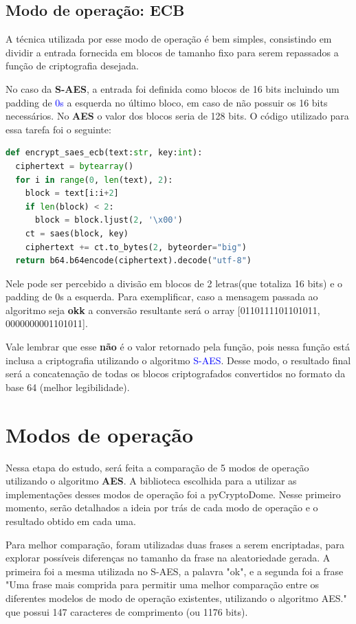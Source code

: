 \documentclass[12pt]{article}
\newcommand{\blue}[1]{\textcolor{blue}{#1}}
\begin{document}
\subsection{Modo de operação: ECB}
A técnica utilizada por esse modo de operação é bem simples, consistindo em dividir a entrada fornecida em blocos de tamanho fixo para serem repassados a função de criptografia desejada.

No caso da \textbf{S-AES}, a entrada foi definida como blocos de 16 bits incluindo um padding de \blue{0s} a esquerda no último bloco, em caso de não possuir os 16 bits necessários. No \textbf{AES} o valor dos blocos seria de 128 bits. O código utilizado para essa tarefa foi o seguinte:

\begin{lstlisting}[language=Python]
def encrypt_saes_ecb(text:str, key:int):
  ciphertext = bytearray()
  for i in range(0, len(text), 2):
    block = text[i:i+2]
    if len(block) < 2:
      block = block.ljust(2, '\x00')
    ct = saes(block, key)
    ciphertext += ct.to_bytes(2, byteorder="big")
  return b64.b64encode(ciphertext).decode("utf-8")
\end{lstlisting}

Nele pode ser percebido a divisão em blocos de 2 letras(que totaliza 16 bits) e o padding de 0s a esquerda. Para exemplificar, caso a mensagem passada ao algoritmo seja \textbf{okk} a conversão resultante será o array [0110111101101011, 0000000001101011]. 

Vale lembrar que esse \textbf{não} é o valor retornado pela função, pois nessa função está inclusa a criptografia utilizando o algoritmo \blue{S-AES}. Desse modo, o resultado final será a concatenação de todas os blocos criptografados convertidos no formato da base 64 (melhor legibilidade).

\section{Modos de operação}
Nessa etapa do estudo, será feita a comparação de 5 modos de operação utilizando o algoritmo \textbf{AES}. A biblioteca escolhida para a utilizar as implementações desses modos de operação foi a pyCryptoDome. Nesse primeiro momento, serão detalhados a ideia por trás de cada modo de operação e o resultado obtido em cada uma.

Para melhor comparação, foram utilizadas duas frases a serem encriptadas, para explorar possíveis diferenças no tamanho da frase na aleatoriedade gerada. A primeira foi a mesma utilizada no S-AES, a palavra "ok", e a segunda foi a frase "Uma frase mais comprida para permitir uma melhor comparação entre os diferentes modelos de modo de operação existentes, utilizando o algoritmo AES." que possui 147 caracteres de comprimento (ou 1176 bits).
\end{document}
